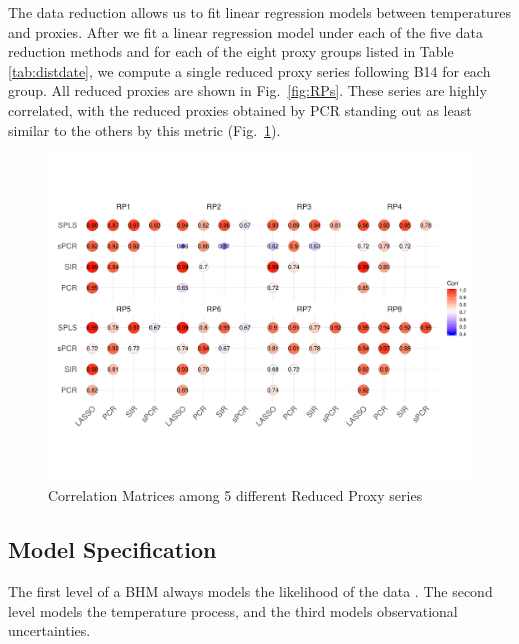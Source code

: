 \documentclass[12pt]{amsart}
\theoremstyle{plain}
\theoremstyle{definition}
\theoremstyle{remark}
\begin{document}
The data reduction allows us to fit linear regression models between
temperatures and proxies. After we fit a linear regression model under each of
the five data reduction methods and for each of the eight proxy groups listed in
Table \ref{tab:distdate}, we compute a single reduced proxy series following
B14 for each group. All reduced proxies are shown in Fig.~\ref{fig:RPs}.  These series are highly correlated, with the reduced proxies obtained by PCR standing out as least similar to the others by this metric (Fig.~\ref{fig:CorrRPs}).

\begin{figure}[h!]
  \vskip -1cm
  \centering
 \includegraphics[scale=0.35]{CorMatrixRPs} 
  \vskip -1.1cm \caption{Correlation Matrices among 5 different Reduced Proxy series}
  \label{fig:CorrRPs}
\end{figure}


\subsection{Model Specification}
\label{sec:modelspec}
 The first level of a BHM always models the likelihood of the data \citep{Tingley_QSR2012}. The second level models the temperature process, and the third models observational uncertainties. 
 
\end{document}
